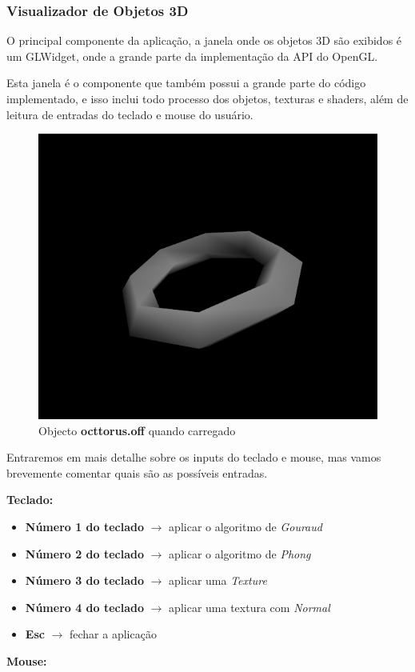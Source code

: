 \documentclass{ol-softwaremanual}
\begin{document}
\newpage

\subsubsection{Visualizador de Objetos 3D}

O principal componente da aplicação, a janela onde os objetos 3D 
são exibidos é um GLWidget, onde a grande parte da implementação da 
API do OpenGL.

Esta janela é o componente que também possui a grande parte do código 
implementado, e isso inclui todo processo dos objetos, texturas e shaders, 
além de leitura de entradas do teclado e mouse do usuário. 

\begin{figure}[H]
    \centering
    \includegraphics[width=.5\textwidth]{opengl.png}
    \caption{Objecto \textbf{octtorus.off} quando carregado}
\end{figure}

Entraremos em mais detalhe sobre os inputs do teclado e mouse, mas vamos
brevemente comentar quais são as possíveis entradas.

\textbf{Teclado:}

\begin{itemize}
    \item \textbf{Número 1 do teclado} $\rightarrow$ aplicar o algoritmo de \emph{Gouraud}
    \item \textbf{Número 2 do teclado} $\rightarrow$ aplicar o algoritmo de \emph{Phong}
    \item \textbf{Número 3 do teclado} $\rightarrow$ aplicar uma \emph{Texture}
    \item \textbf{Número 4 do teclado} $\rightarrow$ aplicar uma textura com \emph{Normal}
    \item \textbf{Esc} $\rightarrow$ fechar a aplicação
\end{itemize}

\textbf{Mouse:}
\end{document}
